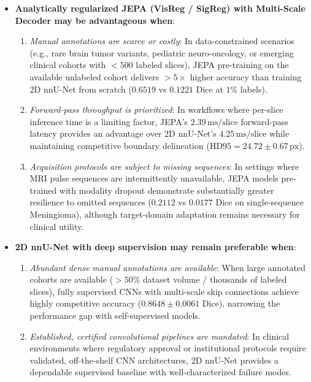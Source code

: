 \documentclass{article}
\begin{document}
\begin{itemize}
    \item \textbf{Analytically regularized JEPA (VisReg / SigReg) with Multi-Scale Decoder may be advantageous when}:
    \begin{enumerate}
        \item \emph{Manual annotations are scarce or costly}: In data-constrained scenarios (e.g., rare brain tumor variants, pediatric neuro-oncology, or emerging clinical cohorts with $< 500$ labeled slices), JEPA pre-training on the available unlabeled cohort delivers $>5\times$ higher accuracy than training 2D nnU-Net from scratch ($0.6519$ vs $0.1221$ Dice at $1\%$ labels).
        \item \emph{Forward-pass throughput is prioritized}: In workflows where per-slice inference time is a limiting factor, JEPA's $2.39\,\text{ms/slice}$ forward-pass latency provides an advantage over 2D nnU-Net's $4.25\,\text{ms/slice}$ while maintaining competitive boundary delineation ($\text{HD95} = 24.72 \pm 0.67\,\text{px}$).
        \item \emph{Acquisition protocols are subject to missing sequences}: In settings where MRI pulse sequences are intermittently unavailable, JEPA models pre-trained with modality dropout demonstrate substantially greater resilience to omitted sequences ($0.2112$ vs $0.0177$ Dice on single-sequence Meningioma), although target-domain adaptation remains necessary for clinical utility.
    \end{enumerate}
    
    \item \textbf{2D nnU-Net with deep supervision may remain preferable when}:
    \begin{enumerate}
        \item \emph{Abundant dense manual annotations are available}: When large annotated cohorts are available ($> 50\%$ dataset volume / thousands of labeled slices), fully supervised CNNs with multi-scale skip connections achieve highly competitive accuracy ($0.8648 \pm 0.0061$ Dice), narrowing the performance gap with self-supervised models.
        \item \emph{Established, certified convolutional pipelines are mandated}: In clinical environments where regulatory approval or institutional protocols require validated, off-the-shelf CNN architectures, 2D nnU-Net provides a dependable supervised baseline with well-characterized failure modes.
    \end{enumerate}
\end{itemize}
\end{document}
